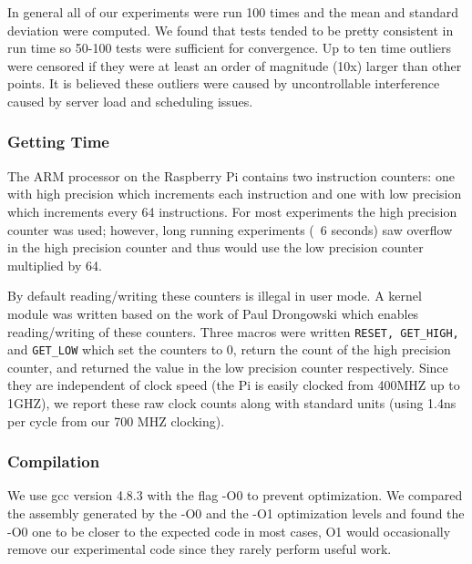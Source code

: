 In general all of our experiments were run 100 times and the mean and standard deviation were computed.
We found that tests tended to be pretty consistent in run time so 50-100 tests were sufficient for convergence.
Up to ten time outliers were censored if they were at least an order of magnitude (10x) larger than other points.  
It is believed these outliers were caused by uncontrollable interference caused by server load and scheduling issues.

\subsubsection{Getting Time}
The ARM processor on the Raspberry Pi contains two instruction counters: one with high precision which increments each instruction and one with low precision which increments every 64 instructions.
For most experiments the high precision counter was used; however, long running experiments (~6 seconds) saw overflow in the high precision counter and thus would use the low precision counter multiplied by 64.  

By default reading/writing these counters is illegal in user mode. 
A kernel module was written based on the work of Paul Drongowski\cite{sand} which enables reading/writing of these counters.
Three macros were written {\tt RESET, GET_HIGH,} and {\tt GET_LOW} which set the counters to 0, return the count of the high precision counter, and returned the value in the low precision counter respectively.
Since they are independent of clock speed (the Pi is easily clocked from 400MHZ up to 1GHZ), we report these raw clock counts along with standard units (using 1.4ns per cycle from our 700 MHZ clocking).


\subsubsection{Compilation}
We use gcc version 4.8.3 with the flag -O0 to prevent optimization.
We compared the assembly generated by the -O0 and the -O1 optimization levels and found the -O0 one to be closer to the expected code in most cases, O1 would occasionally remove our experimental code since they rarely perform useful work.